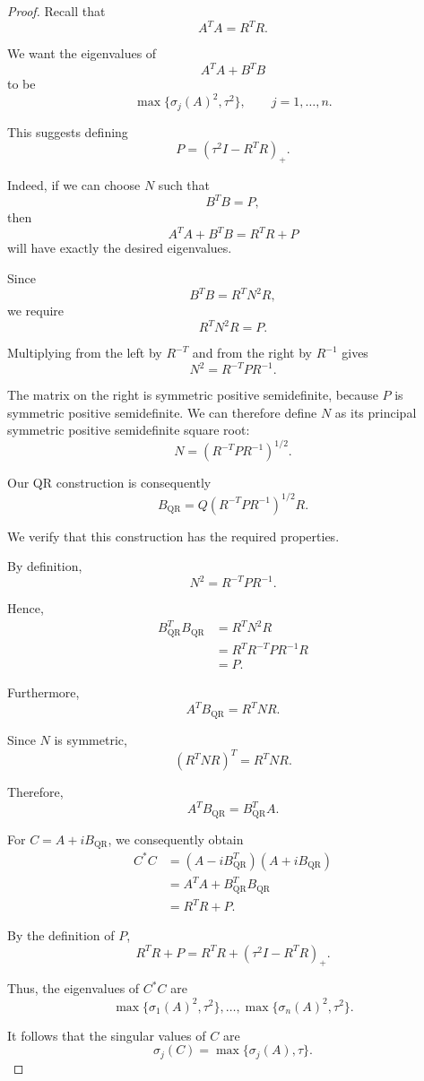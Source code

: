 \documentclass[11pt, reqno, a4paper]{amsart}
\theoremstyle{plain}
\theoremstyle{definition}
\theoremstyle{remark}
\numberwithin{equation}{section}
\begin{document}
\begin{proof}
Recall that
\[
A^TA=R^TR.
\]

We want the eigenvalues of
\[
A^TA+B^TB
\]
to be
\[
\max\{\sigma_j(A)^2,\tau^2\},
\qquad j=1,\ldots,n.
\]

This suggests defining
\[
\boxed{
P=(\tau^2I-R^TR)_+.
}
\]

Indeed, if we can choose $N$ such that
\[
B^TB=P,
\]
then
\[
A^TA+B^TB
=
R^TR+P
\]
will have exactly the desired eigenvalues.

Since
\[
B^TB=R^TN^2R,
\]
we require
\[
R^TN^2R=P.
\]

Multiplying from the left by $R^{-T}$ and from the right
by $R^{-1}$ gives
\[
N^2=R^{-T}PR^{-1}.
\]

The matrix on the right is symmetric positive semidefinite,
because $P$ is symmetric positive semidefinite. We can
therefore define $N$ as its principal symmetric positive
semidefinite square root:
\[
\boxed{
N=(R^{-T}PR^{-1})^{1/2}.
}
\]

Our QR construction is consequently
\[
\boxed{
B_{\mathrm{QR}}
=
Q(R^{-T}PR^{-1})^{1/2}R.
}
\]

We verify that this construction has the required
properties.

By definition,
\[
N^2=R^{-T}PR^{-1}.
\]

Hence,
\begin{align*}
B_{\mathrm{QR}}^TB_{\mathrm{QR}}
&=R^TN^2R\\
&=R^TR^{-T}PR^{-1}R\\
&=P.
\end{align*}

Furthermore,
\[
A^TB_{\mathrm{QR}}
=
R^TNR.
\]

Since $N$ is symmetric,
\[
(R^TNR)^T=R^TNR.
\]

Therefore,
\[
A^TB_{\mathrm{QR}}
=
B_{\mathrm{QR}}^TA.
\]

For $C=A+iB_{\mathrm{QR}}$, we consequently obtain
\begin{align*}
C^*C
&=(A-iB_{\mathrm{QR}}^T)
  (A+iB_{\mathrm{QR}})\\
&=A^TA+B_{\mathrm{QR}}^TB_{\mathrm{QR}}\\
&=R^TR+P.
\end{align*}

By the definition of $P$,
\[
R^TR+P
=
R^TR+(\tau^2I-R^TR)_+.
\]

Thus, the eigenvalues of $C^*C$ are
\[
\max\{\sigma_1(A)^2,\tau^2\},
\ldots,
\max\{\sigma_n(A)^2,\tau^2\}.
\]

It follows that the singular values of $C$ are
\[
\sigma_j(C)=\max\{\sigma_j(A),\tau\}.
\]


\end{proof}
\end{document}
